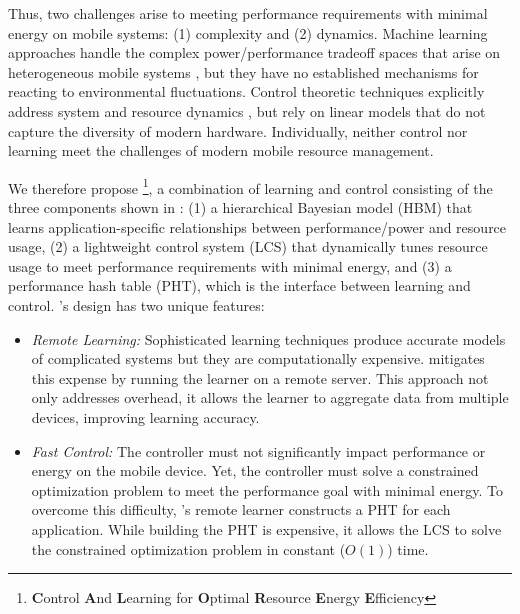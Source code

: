 Thus, two challenges arise to meeting performance requirements with
minimal energy on mobile systems: (1) complexity and (2) dynamics.
Machine learning approaches handle the complex power/performance
tradeoff spaces that arise on heterogeneous mobile systems
\cite{reddiHPCA2013,dubach2010,Bitirgen2008,Ipek,Koala,LEO,Flicker,Ponamarev},
but they have no established mechanisms for reacting to environmental
fluctuations.    Control theoretic techniques explicitly address
system and resource dynamics
\cite{Hellerstein2004a,Chen2011,PTRADE,POET,ControlWare,Agilos,grace2},
but rely on linear models that do not capture the diversity of modern
hardware.   Individually, neither control nor learning
meet the challenges of modern mobile resource management.

We therefore propose \SYSTEM{}\footnote{\textbf{C}ontrol \textbf{A}nd
  \textbf{L}earning for \textbf{O}ptimal \textbf{R}esource
  \textbf{E}nergy \textbf{E}fficiency}, a combination of learning and
control consisting of the three components shown in
: (1) a hierarchical Bayesian model (HBM) that
learns application-specific relationships between performance/power
and resource usage, (2) a lightweight control system (LCS) that
dynamically tunes resource usage to meet performance requirements with
minimal energy, and (3) a performance hash table (PHT), which is the
interface between learning and control.  \SYSTEM{}'s design has two
unique features:
\begin{itemize}
\item \textit{Remote Learning:} Sophisticated learning techniques
  produce accurate models of complicated systems but they are
  computationally expensive.  \SYSTEM{} mitigates this expense by
  running the learner on a remote server. This approach not only
  addresses overhead, it allows the learner to aggregate data from
  multiple devices, improving learning accuracy.
\item \textit{Fast Control:} The controller must not significantly
  impact performance or energy on the mobile device.  Yet, the
  controller must solve a constrained optimization problem to meet the
  performance goal with minimal energy.  To overcome this difficulty,
  \SYSTEM{}'s remote learner constructs a PHT for each application.
  While building the PHT is expensive, it allows the LCS to solve the
  constrained optimization problem in constant ($O(1)$) time.
\end{itemize}

